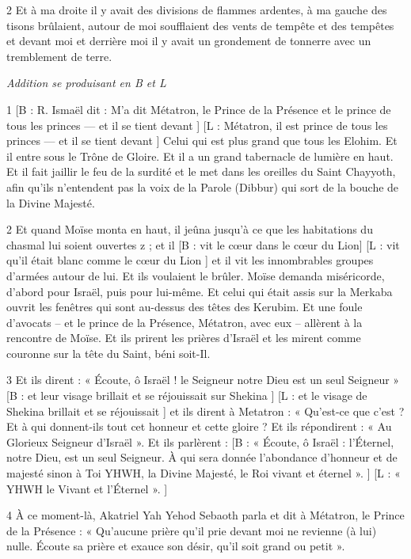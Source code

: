 \par 2 Et à ma droite il y avait des divisions de flammes ardentes, à ma gauche des tisons brûlaient, autour de moi soufflaient des vents de tempête et des tempêtes et devant moi et derrière moi il y avait un grondement de tonnerre avec un tremblement de terre.


\par \textit{Addition se produisant en B et L}

\par 1 [B : R. Ismaël dit : M'a dit Métatron, le Prince de la Présence et le prince de tous les princes — et il se tient devant ] [L : Métatron, il est prince de tous les princes — et il se tient devant ] Celui qui est plus grand que tous les Elohim. Et il entre sous le Trône de Gloire. Et il a un grand tabernacle de lumière en haut. Et il fait jaillir le feu de la surdité et le met dans les oreilles du Saint Chayyoth, afin qu'ils n'entendent pas la voix de la Parole (Dibbur) qui sort de la bouche de la Divine Majesté.

\par 2 Et quand Moïse monta en haut, il jeûna jusqu'à ce que les habitations du chasmal lui soient ouvertes z ; et il [B : vit le cœur dans le cœur du Lion] [L : vit qu'il était blanc comme le cœur du Lion ] et il vit les innombrables groupes d'armées autour de lui. Et ils voulaient le brûler. Moïse demanda miséricorde, d'abord pour Israël, puis pour lui-même. Et celui qui était assis sur la Merkaba ouvrit les fenêtres qui sont au-dessus des têtes des Kerubim. Et une foule d’avocats – et le prince de la Présence, Métatron, avec eux – allèrent à la rencontre de Moïse. Et ils prirent les prières d'Israël et les mirent comme couronne sur la tête du Saint, béni soit-Il.

\par 3 Et ils dirent : « Écoute, ô Israël ! le Seigneur notre Dieu est un seul Seigneur » [B : et leur visage brillait et se réjouissait sur Shekina ] [L : et le visage de Shekina brillait et se réjouissait ] et ils dirent à Metatron : « Qu'est-ce que c'est ? Et à qui donnent-ils tout cet honneur et cette gloire ? Et ils répondirent : « Au Glorieux Seigneur d’Israël ». Et ils parlèrent : [B : « Écoute, ô Israël : l’Éternel, notre Dieu, est un seul Seigneur. À qui sera donnée l’abondance d’honneur et de majesté sinon à Toi YHWH, la Divine Majesté, le Roi vivant et éternel ». ] [L : « YHWH le Vivant et l'Éternel ». ]

\par 4 À ce moment-là, Akatriel Yah Yehod Sebaoth parla et dit à Métatron, le Prince de la Présence : « Qu'aucune prière qu'il prie devant moi ne revienne (à lui) nulle. Écoute sa prière et exauce son désir, qu'il soit grand ou petit ».

